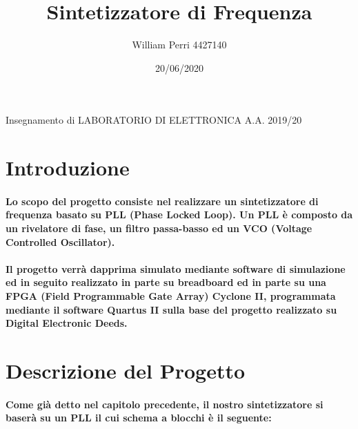 \documentclass{article}
\title{Sintetizzatore di Frequenza}
\author{William Perri 4427140 }
\date{20/06/2020}
\begin{document}
\maketitle
Insegnamento di LABORATORIO DI ELETTRONICA A.A. 2019/20

\newpage
\tableofcontents
\newpage
\section{Introduzione}
\paragraph{Lo scopo del progetto consiste nel realizzare un sintetizzatore di frequenza basato su PLL (Phase Locked Loop).
Un PLL è composto da un rivelatore di fase, un filtro passa-basso ed un VCO (Voltage Controlled Oscillator).}
\paragraph{ Il progetto verrà dapprima simulato mediante software di simulazione ed in seguito realizzato in parte su breadboard ed in parte su una FPGA (Field Programmable Gate Array) Cyclone II, programmata mediante il software Quartus II sulla base del progetto realizzato su Digital Electronic Deeds.}


\newpage
\section{Descrizione del Progetto}

\paragraph{Come già detto nel capitolo precedente, il nostro sintetizzatore si baserà su un PLL il cui schema a blocchi è il seguente:\\ }
\end{document}
